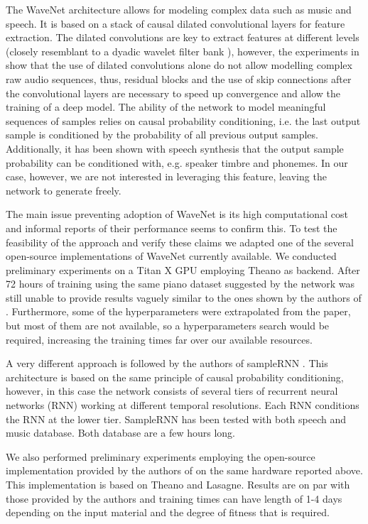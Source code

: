 The WaveNet architecture allows for modeling complex data such as music and speech. It is based on a stack of causal dilated convolutional layers for feature extraction. The dilated convolutions are key to extract features at different levels (closely resemblant to a dyadic wavelet filter bank \cite{jin2018fftnet}), however, the experiments in \cite{cabello2017autoregressive} show that the use of dilated convolutions alone do not allow modelling complex raw audio sequences, thus, residual blocks and the use of skip connections after the convolutional layers are necessary to speed up convergence and allow the training of a deep model. The ability of the network to model meaningful sequences of samples relies on causal probability conditioning, i.e. the last output sample is conditioned by the probability of all previous output samples. Additionally, it has been shown with speech synthesis that the output sample probability can be conditioned with, e.g. speaker timbre and phonemes. In our case, however, we are not interested in leveraging this feature, leaving the network to generate freely.

The main issue preventing adoption of WaveNet is its high computational cost and informal reports of their performance seems to confirm this. To test the feasibility of the approach and verify these claims we adapted one of the several open-source implementations of WaveNet currently available. We conducted preliminary experiments on a Titan X GPU employing Theano as backend. After 72 hours of training using the same piano dataset suggested by \cite{van2016wavenet} the network was still unable to provide results vaguely similar to the ones shown by the authors of \cite{van2016wavenet}. Furthermore, some of the hyperparameters were extrapolated from the paper, but most of them are not available, so a hyperparameters search would be required, increasing the training times far over our available resources.

A very different approach is followed by the authors of sampleRNN \cite{mehri2016samplernn}. This architecture is based on the same principle of causal probability conditioning, however, in this case the network consists of several tiers of recurrent neural networks (RNN) working at different temporal resolutions. Each RNN conditions the RNN at the lower tier. SampleRNN has been tested with both speech and music database. Both database are a few hours long.

We also performed preliminary experiments employing the open-source implementation provided by the authors of \cite{mehri2016samplernn} on the same hardware reported above. This implementation is based on Theano and Lasagne. Results are on par with those provided by the authors and training times can have length of 1-4 days depending on the input material and the degree of fitness that is required.

